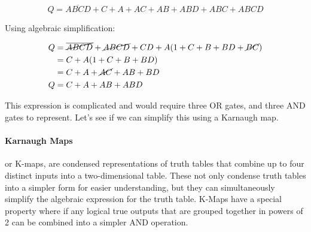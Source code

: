     \begin{equation*}
        Q = \overline{ABCD} + C + A + AC + AB + ABD + ABC + ABCD 
    \end{equation*}

    Using algebraic simplification:

    \begin{align}
        Q &= \cancel{\overline{ABCD}} + \cancel{ABCD} + CD + A(1 + C + B + BD + \cancel{BC}) \nonumber \\
          &= C + A(1 + C + B + BD) \nonumber \\
          &= C + A + \cancel{AC} + AB + BD \nonumber \\
        Q &= C + A + AB + ABD \nonumber
    \end{align}


    This expression is complicated and would require three OR gates, and three AND gates to represent.
    Let's see if we can simplify this using a Karnaugh map.

    \paragraph*{Karnaugh Maps} or K-maps, are condensed representations of truth tables that combine up to four distinct inputs into a two-dimensional table.
    These not only condense truth tables into a simpler form for easier understanding, but they can simultaneously simplify the algebraic expression for the truth table.
    K-Maps have a special property where if any logical true outputs that are grouped together in powers of 2 can be combined into a simpler AND operation.

